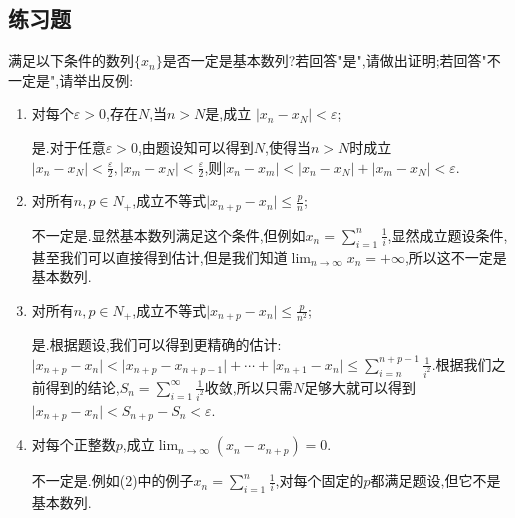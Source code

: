 \documentclass[cn,chinese,fontset]{elegantbook}
\begin{document}
            \subsection{练习题}
            \begin{exercise}
                满足以下条件的数列$\{x_n\}$是否一定是基本数列?若回答"是",请做出证明;若回答"不一定是",请举出反例:
                \begin{enumerate}
                    \item 对每个$\varepsilon>0$,存在$N$,当$n>N$是,成立
                    $\lvert x_n-x_N\rvert<\varepsilon$;
                    \begin{solution}
                        是.对于任意$\varepsilon>0$,由题设知可以得到$N$,使得当$n>N$时成立$\lvert x_n-x_N\rvert<\frac{\varepsilon}{2},\lvert x_m-x_N\rvert<\frac{\varepsilon}{2}$,则$\lvert x_n-x_m\rvert<\lvert x_n-x_N\rvert+\lvert x_m-x_N\rvert<\varepsilon$.
                    \end{solution}
                    \item 对所有$n,p\in N_+$,成立不等式$\lvert x_{n+p}-x_n\rvert\leqslant\frac{p}{n}$;
                    \begin{solution}
                        不一定是.显然基本数列满足这个条件,但例如$x_n=\sum_{i=1}^{n}\frac{1}{i}$,显然成立题设条件,甚至我们可以直接得到估计,但是我们知道$\lim_{n\to\infty}x_n=+\infty$,所以这不一定是基本数列.
                    \end{solution}
                    \item 对所有$n,p\in N_+$,成立不等式$\lvert x_{n+p}-x_n\rvert\leqslant\frac{p}{n^2}$;
                    \begin{solution}
                        是.根据题设,我们可以得到更精确的估计:$\lvert x_{n+p}-x_n\rvert<\lvert x_{n+p}-x_{n+p-1}\rvert+\cdots+\lvert x_{n+1}-x_{n}\rvert\leqslant\sum_{i=n}^{n+p-1}\frac{1}{i^2}$.根据我们之前得到的结论,$S_n=\sum_{i=1}^{\infty}\frac{1}{i^2}$收敛,所以只需$N$足够大就可以得到$\lvert x_{n+p}-x_n\rvert<S_{n+p}-S_n<\varepsilon$.
                    \end{solution}
                    \item 对每个正整数$p$,成立$\lim_{n\to\infty}(x_n-x_{n+p})=0$.
                    \begin{solution}
                        不一定是.例如(2)中的例子$x_n=\sum_{i=1}^{n}\frac{1}{i}$,对每个固定的$p$都满足题设,但它不是基本数列.
                    \end{solution}
                \end{enumerate}
            \end{exercise}
\end{document}
